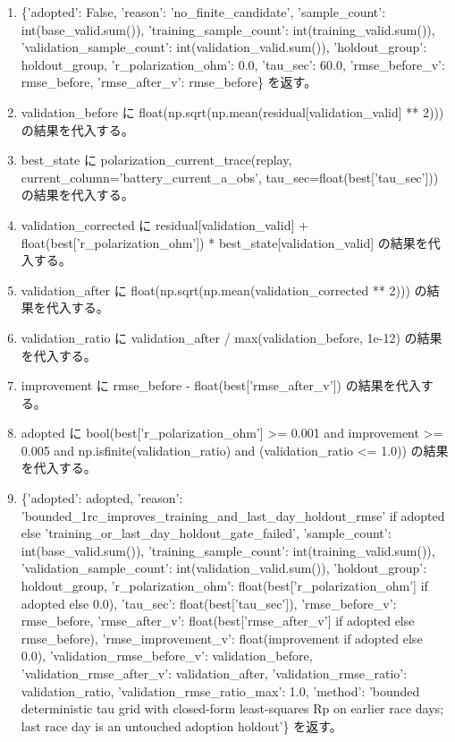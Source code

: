 \documentclass[a4paper,11pt]{article}
\begin{document}
\begin{enumerate}[leftmargin=1.8em]
\item   \{'adopted': False, 'reason': 'no\_finite\_candidate', 'sample\_count': int(base\_valid.sum()), 'training\_sample\_count': int(training\_valid.sum()), 'validation\_sample\_count': int(validation\_valid.sum()), 'holdout\_group': holdout\_group, 'r\_polarization\_ohm': 0.0, 'tau\_sec': 60.0, 'rmse\_before\_v': rmse\_before, 'rmse\_after\_v': rmse\_before\} を返す。
\item validation\_before に float(np.sqrt(np.mean(residual[validation\_valid] ** 2))) の結果を代入する。
\item best\_state に polarization\_current\_trace(replay, current\_column='battery\_current\_a\_obs', tau\_sec=float(best['tau\_sec'])) の結果を代入する。
\item validation\_corrected に residual[validation\_valid] + float(best['r\_polarization\_ohm']) * best\_state[validation\_valid] の結果を代入する。
\item validation\_after に float(np.sqrt(np.mean(validation\_corrected ** 2))) の結果を代入する。
\item validation\_ratio に validation\_after / max(validation\_before, 1e-12) の結果を代入する。
\item improvement に rmse\_before - float(best['rmse\_after\_v']) の結果を代入する。
\item adopted に bool(best['r\_polarization\_ohm'] >= 0.001 and improvement >= 0.005 and np.isfinite(validation\_ratio) and (validation\_ratio <= 1.0)) の結果を代入する。
\item \{'adopted': adopted, 'reason': 'bounded\_1rc\_improves\_training\_and\_last\_day\_holdout\_rmse' if adopted else 'training\_or\_last\_day\_holdout\_gate\_failed', 'sample\_count': int(base\_valid.sum()), 'training\_sample\_count': int(training\_valid.sum()), 'validation\_sample\_count': int(validation\_valid.sum()), 'holdout\_group': holdout\_group, 'r\_polarization\_ohm': float(best['r\_polarization\_ohm'] if adopted else 0.0), 'tau\_sec': float(best['tau\_sec']), 'rmse\_before\_v': rmse\_before, 'rmse\_after\_v': float(best['rmse\_after\_v'] if adopted else rmse\_before), 'rmse\_improvement\_v': float(improvement if adopted else 0.0), 'validation\_rmse\_before\_v': validation\_before, 'validation\_rmse\_after\_v': validation\_after, 'validation\_rmse\_ratio': validation\_ratio, 'validation\_rmse\_ratio\_max': 1.0, 'method': 'bounded deterministic tau grid with closed-form least-squares Rp on earlier race days; last race day is an untouched adoption holdout'\} を返す。
            \end{enumerate}
\end{document}
